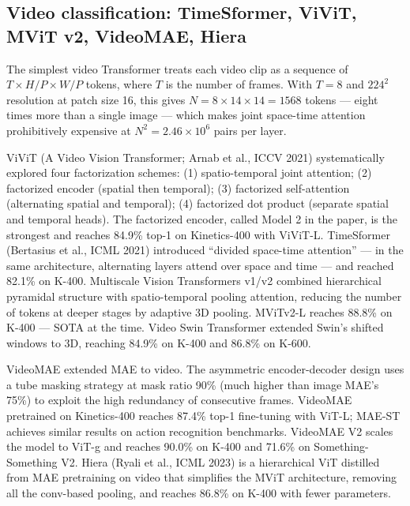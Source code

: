 \documentclass{article}
\begin{document}
\subsection{Video classification: TimeSformer, ViViT, MViT v2, VideoMAE, Hiera}\label{video-classification-timesformer-vivit-mvit-v2-videomae-hiera}

The simplest video Transformer treats each video clip as a sequence of \(T \times H/P \times W/P\) tokens, where \(T\) is the number of frames. With \(T=8\) and \(224^2\) resolution at patch size 16, this gives \(N = 8 \times 14 \times 14 = 1568\) tokens --- eight times more than a single image --- which makes joint space-time attention prohibitively expensive at \(N^2 = 2.46\times 10^6\) pairs per layer.

ViViT (A Video Vision Transformer; Arnab et al., ICCV 2021) systematically explored four factorization schemes: (1) spatio-temporal joint attention; (2) factorized encoder (spatial then temporal); (3) factorized self-attention (alternating spatial and temporal); (4) factorized dot product (separate spatial and temporal heads). The factorized encoder, called Model 2 in the paper, is the strongest and reaches 84.9\% top-1 on Kinetics-400 with ViViT-L. TimeSformer (Bertasius et al., ICML 2021) introduced ``divided space-time attention'' --- in the same architecture, alternating layers attend over space and time --- and reached 82.1\% on K-400. Multiscale Vision Transformers v1/v2 \citep{fan2021multiscalevisiontr} combined hierarchical pyramidal structure with spatio-temporal pooling attention, reducing the number of tokens at deeper stages by adaptive 3D pooling. MViTv2-L reaches 88.8\% on K-400 --- SOTA at the time. Video Swin Transformer \citep{liu2022aconvnetforthe2020} extended Swin's shifted windows to 3D, reaching 84.9\% on K-400 and 86.8\% on K-600.

VideoMAE \citep{tong2022videomaemaskedauto} extended MAE to video. The asymmetric encoder-decoder design uses a tube masking strategy at mask ratio 90\% (much higher than image MAE's 75\%) to exploit the high redundancy of consecutive frames. VideoMAE pretrained on Kinetics-400 reaches 87.4\% top-1 fine-tuning with ViT-L; MAE-ST \citep{he2022maskedautoencoders} achieves similar results on action recognition benchmarks. VideoMAE V2 scales the model to ViT-g and reaches 90.0\% on K-400 and 71.6\% on Something-Something V2. Hiera (Ryali et al., ICML 2023) is a hierarchical ViT distilled from MAE pretraining on video that simplifies the MViT architecture, removing all the conv-based pooling, and reaches 86.8\% on K-400 with fewer parameters.
\end{document}
